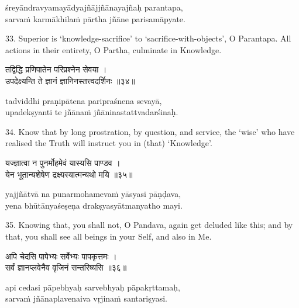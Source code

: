 \begin{transliteration}
śreyāndravyamayādyajñājjñānayajñaḥ parantapa, \\
sarvaṁ karmākhilaṁ pārtha jñāne parisamāpyate.
\end{transliteration}

33. Superior is `knowledge-sacrifice' to `sacrifice-with-objects', O Parantapa.
All actions in their entirety, O Partha, culminate in Knowledge.

\begin{gitaverse}
तद्विद्धि प्रणिपातेन परिप्रश्नेन सेवया । \\
उपदेक्ष्यन्ति ते ज्ञानं ज्ञानिनस्तत्त्वदर्शिनः ॥३४॥
\end{gitaverse}

\begin{transliteration}
tadviddhi praṇipātena paripraśnena sevayā, \\
upadekṣyanti te jñānaṁ jñāninastattvadarśinaḥ.
\end{transliteration}

34. Know that by long prostration, by question, and service, the `wise' who
have realised the Truth will instruct you in (that) `Knowledge'.

\begin{gitaverse}
यज्ज्ञात्वा न पुनर्मोहमेवं यास्यसि पाण्डव । \\
येन भूतान्यशेषेण द्रक्ष्यस्यात्मन्यथो मयि ॥३५॥
\end{gitaverse}

\begin{transliteration}
yajjñātvā na punarmohamevaṁ yāsyasi pāṇḍava, \\
yena bhūtānyaśeṣeṇa drakṣyasyātmanyatho mayi.
\end{transliteration}

35. Knowing that, you shall not, O Pandava, again get deluded like this; and by
that, you shall see all beings in your Self, and also in Me.

\begin{gitaverse}
अपि चेदसि पापेभ्यः सर्वेभ्यः पापकृत्तमः । \\
सर्वं ज्ञानप्लवेनैव वृजिनं सन्तरिष्यसि ॥३६॥
\end{gitaverse}

\begin{transliteration}
api cedasi pāpebhyaḥ sarvebhyaḥ pāpakṛttamaḥ, \\
sarvaṁ jñānaplavenaiva vṛjinaṁ santariṣyasi.
\end{transliteration}

